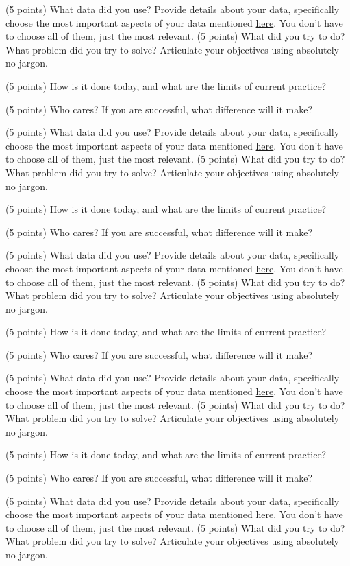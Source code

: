 \documentclass[10pt,twocolumn,letterpaper]{article}
\begin{document}
(5 points) What data did you use? Provide details about your data, specifically choose the most important aspects of your data mentioned \href{https://arxiv.org/abs/1803.09010}{here}. You don’t have to choose all of them, just the most relevant.
(5 points) What did you try to do? What problem did you try to solve? Articulate your objectives using absolutely no jargon. 

(5 points) How is it done today, and what are the limits of current practice?

(5 points) Who cares? If you are successful, what difference will it make? 

(5 points) What data did you use? Provide details about your data, specifically choose the most important aspects of your data mentioned \href{https://arxiv.org/abs/1803.09010}{here}. You don’t have to choose all of them, just the most relevant.
(5 points) What did you try to do? What problem did you try to solve? Articulate your objectives using absolutely no jargon. 

(5 points) How is it done today, and what are the limits of current practice?

(5 points) Who cares? If you are successful, what difference will it make? 

(5 points) What data did you use? Provide details about your data, specifically choose the most important aspects of your data mentioned \href{https://arxiv.org/abs/1803.09010}{here}. You don’t have to choose all of them, just the most relevant.
(5 points) What did you try to do? What problem did you try to solve? Articulate your objectives using absolutely no jargon. 

(5 points) How is it done today, and what are the limits of current practice?

(5 points) Who cares? If you are successful, what difference will it make? 

(5 points) What data did you use? Provide details about your data, specifically choose the most important aspects of your data mentioned \href{https://arxiv.org/abs/1803.09010}{here}. You don’t have to choose all of them, just the most relevant.
(5 points) What did you try to do? What problem did you try to solve? Articulate your objectives using absolutely no jargon. 

(5 points) How is it done today, and what are the limits of current practice?

(5 points) Who cares? If you are successful, what difference will it make? 

(5 points) What data did you use? Provide details about your data, specifically choose the most important aspects of your data mentioned \href{https://arxiv.org/abs/1803.09010}{here}. You don’t have to choose all of them, just the most relevant.
(5 points) What did you try to do? What problem did you try to solve? Articulate your objectives using absolutely no jargon. 
\end{document}
